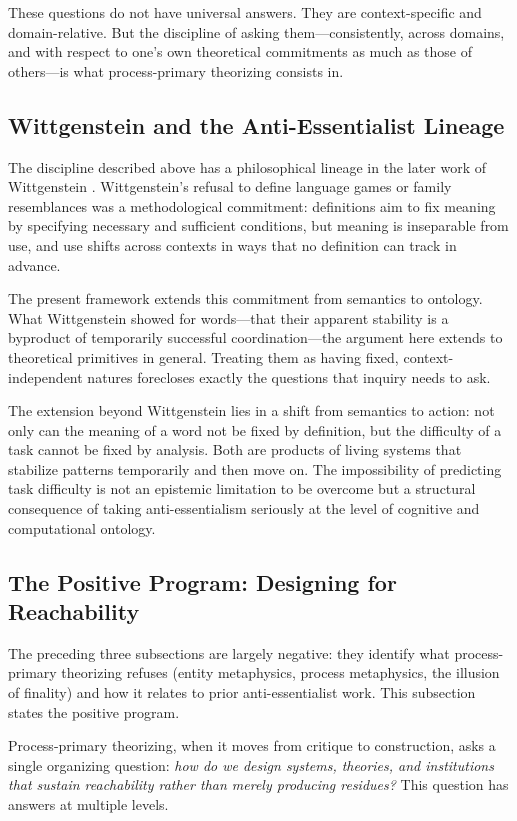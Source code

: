 \documentclass[12pt, a4paper]{article}
\theoremstyle{plain}
\theoremstyle{definition}
\theoremstyle{remark}
\begin{document}
These questions do not have universal answers. They are context-specific
and domain-relative. But the discipline of asking them---consistently,
across domains, and with respect to one's own theoretical commitments
as much as those of others---is what process-primary theorizing consists in.

\subsection{Wittgenstein and the Anti-Essentialist Lineage}

The discipline described above has a philosophical lineage in the later work
of Wittgenstein \citep{wittgenstein1953}. Wittgenstein's refusal to define
language games or family resemblances was a methodological commitment:
definitions aim to fix meaning by specifying necessary and sufficient
conditions, but meaning is inseparable from use, and use shifts across
contexts in ways that no definition can track in advance.

The present framework extends this commitment from semantics to ontology.
What Wittgenstein showed for words---that their apparent stability is a byproduct
of temporarily successful coordination---the argument here extends to
theoretical primitives in general. Treating them as having fixed,
context-independent natures forecloses exactly the questions that inquiry
needs to ask.

The extension beyond Wittgenstein lies in a shift from semantics to action:
not only can the meaning of a word not be fixed by definition, but the
difficulty of a task cannot be fixed by analysis. Both are products of living
systems that stabilize patterns temporarily and then move on. The impossibility
of predicting task difficulty is not an epistemic limitation to be overcome but
a structural consequence of taking anti-essentialism seriously at the level of
cognitive and computational ontology.

\subsection{The Positive Program: Designing for Reachability}

The preceding three subsections are largely negative: they identify what
process-primary theorizing refuses (entity metaphysics, process metaphysics,
the illusion of finality) and how it relates to prior anti-essentialist
work. This subsection states the positive program.

Process-primary theorizing, when it moves from critique to construction,
asks a single organizing question: \emph{how do we design systems, theories,
and institutions that sustain reachability rather than merely producing
residues?} This question has answers at multiple levels.
\end{document}
